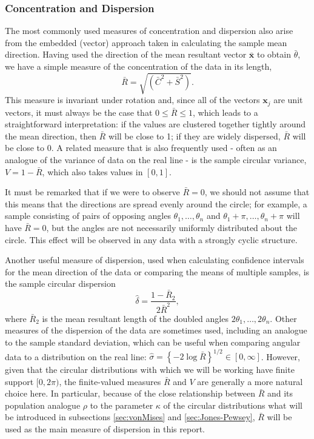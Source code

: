 \documentclass[../../ArchStats.tex]{subfiles}
\begin{document}
\subsubsection{Concentration and Dispersion}

The most commonly used measures of concentration and dispersion also arise from the embedded (vector) approach taken in calculating the sample mean direction. Having used the direction of the mean resultant vector $\mathbf{\bar{x}}$ to obtain $\bar{\theta}$, we have a simple measure of the concentration of the data in its length, 
	\begin{equation}
	\label{eqn:R-bar}
	\bar{R} = \sqrt{(\bar{C}^2 + \bar{S}^2)}.
	\end{equation}
This measure is invariant under rotation and, since all of the vectors $\mathbf{x}_j$ are unit vectors, it must always be the case that $0 \leq \bar{R} \leq 1$, which leads to a straightforward interpretation: if the values are clustered together tightly around the mean direction, then $\bar{R}$ will be close to 1; if they are widely dispersed, $\bar{R}$ will be close to 0. A related measure that is also frequently used - often as an analogue of the variance of data on the real line - is the sample circular variance, $V = 1- \bar{R}$, which also takes values in $[0,1]$. 

It must be remarked that if we were to observe $\bar{R} = 0$, we should not assume that this means that the directions are spread evenly around the circle; for example, a sample consisting of pairs of opposing angles $\theta_1, \dots, \theta_n$ and $\theta_1+\pi, \dots, \theta_n+\pi$ will have $\bar{R} = 0$, but the angles are not necessarily uniformly distributed about the circle. This effect will be observed in any data with a strongly cyclic structure.

Another useful measure of dispersion, used when calculating confidence intervals for the mean direction of the data or comparing the means of multiple samples, is the sample circular dispersion
\begin{equation}
\hat{\delta} = \frac{1-\bar{R}_2}{2\bar{R}^2},
\end{equation}
where $\bar{R}_2$ is the mean resultant length of the doubled angles $2\theta_1, \dots, 2\theta_n$. 
Other measures of the dispersion of the data are sometimes used, including an analogue to the  sample standard deviation, which can be useful when comparing angular data to a distribution on the real line: $\hat{\sigma} = \left\lbrace -2 \log \bar{R} \right\rbrace ^{1/2} \in [0, \infty]$. However, given that the circular distributions with which we will be working have finite support $[0, 2\pi)$, the finite-valued measures $\bar{R}$ and $V$ are generally a more natural choice here. In particular, because of the close relationship between $\bar{R}$ and its population analogue $\rho$ to the parameter $\kappa$ of the circular distributions what will be introduced in subsections \ref{sec:vonMises} and \ref{sec:Jones-Pewsey}, $\bar{R}$ will be used as the main measure of dispersion in this report.
 
\end{document}
